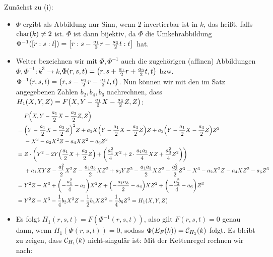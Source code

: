 \begin{bew}
	Zunächst zu (i): \begin{itemize}
		\item $\Phi$ ergibt als Abbildung nur Sinn, wenn $2$ invertierbar ist in $k$, das heißt, falls $\operatorname{char}(k) \neq 2$ ist. $\Phi$ ist dann bijektiv, da $\Phi$ die Umkehrabbildung $\Phi^{-1}([r:s:t]) = \left\lbrack r : s - \frac{a_1}{2}r - \frac{a_3}{2}t : t\right\rbrack$ hat.
		\item Weiter bezeichnen wir mit $\Phi, \Phi^{-1}$ auch die zugehörigen (affinen) Abbildungen $\Phi, \Phi^{-1}\colon k^3 \longrightarrow k$,\linebreak $\Phi(r,s,t) = \left(r,s+ \frac{a_1}{2}r + \frac{a_3}{2}t, t\right)$ bzw. $\Phi^{-1}(r,s,t) = \left(r,s - \frac{a_1}{2}r - \frac{a_3}{2}t,t\right)$. 
		Nun können wir mit den im Satz angegebenen Zahlen $b_2,b_4,b_6$ nachrechnen, dass $H_1(X,Y,Z) = F\enb{X,Y - \frac{a_1}{2}X - \frac{a_3}{2}Z,Z}$:
		\begin{equation}
		\begin{aligned}
			& \quad \ F\enb{X,Y-\frac{a_1}{2}X-\frac{a_3}{2}Z,Z} \\
			&= \enb{Y- \frac{a_1}{2} X - \frac{a_3}{2}Z}^2 Z + a_1 X \enb{Y - \frac{a_1}{2} X - \frac{a_3}{2}Z}Z + a_3 \enb{Y - \frac{a_1}{2} X - \frac{a_3}{2} Z}Z^2 \\
			& \quad \ - X^3 - a_2X^2Z - a_4 XZ^2 - a_6Z^3 \\
			&= Z \cdot \enb{Y^2 - 2Y \enb{\frac{a_1}{2}X + \frac{a_3}{2} Z} + \enb{\frac{a_1^2}{4} X^2 + 2 \cdot \frac{a_1 a_3}{4} XZ + \frac{a_3^2}{4} Z^2}} \\
			& \quad \ + a_1XYZ - \frac{a_1^2}{2} X^2 Z - \frac{a_1 a_3}{2} XZ^2 + a_3 YZ^2 - \frac{a_1 a_3}{2} XZ^2 - \frac{a_3^2}{2} Z^3 - X^3 - a_2 X^2 Z - a_4 XZ^2 - a_6Z^3 \\
			&= Y^2 Z - X^3 + \enb{-\frac{a_1^2}{4} - a_2} X^2 Z + \enb{- \frac{a_1 a_3}{2} - a_4} XZ^2 + \enb{- \frac{a_3^2}{4} - a_6} Z^3 \\
			&= Y^2 Z - X^3 - \frac{1}{4} b_2 X^2 Z - \frac{1}{2} b_4 XZ^2 - \frac{1}{4} b_6 Z^3 = H_1(X,Y,Z)
		\end{aligned}
		\end{equation}
		\item Es folgt $H_1(r,s,t) = F(\Phi^{-1}(r,s,t))$, also gilt $F(r,s,t) = 0$ genau dann, wenn $H_1(\Phi(r,s,t))=0$, sodass $\Phi (E_F(k)) = \mathcal{C}_{H_1}(k)$ folgt. 
		Es bleibt zu zeigen, dass $\mathcal{C}_{H_1}(k)$ nicht-singulär ist: Mit der Kettenregel rechnen wir nach:
		\begin{equation}
		\begin{aligned}

\end{aligned}
\end{equation}
\end{itemize}
\end{bew}
